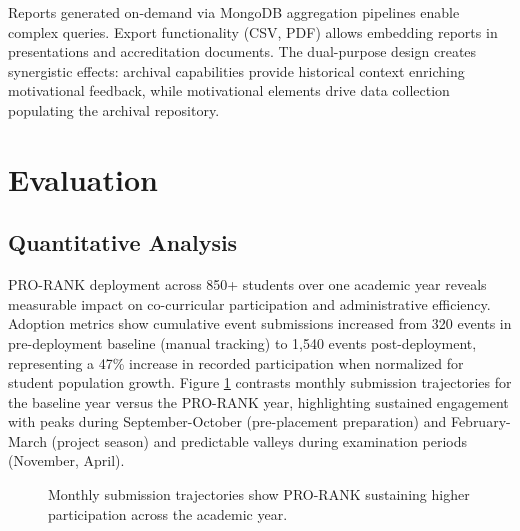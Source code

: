\documentclass[12pt]{article}
\begin{document}
Reports generated on-demand via MongoDB aggregation pipelines enable complex queries. Export functionality (CSV, PDF) allows embedding reports in presentations and accreditation documents. The dual-purpose design creates synergistic effects: archival capabilities provide historical context enriching motivational feedback, while motivational elements drive data collection populating the archival repository.


\section{Evaluation}

\subsection{Quantitative Analysis}
PRO-RANK deployment across 850+ students over one academic year reveals measurable impact on co-curricular participation and administrative efficiency. Adoption metrics show cumulative event submissions increased from 320 events in pre-deployment baseline (manual tracking) to 1,540 events post-deployment, representing a 47\% increase in recorded participation when normalized for student population growth. Figure \ref{fig:adoption} contrasts monthly submission trajectories for the baseline year versus the PRO-RANK year, highlighting sustained engagement with peaks during September-October (pre-placement preparation) and February-March (project season) and predictable valleys during examination periods (November, April).

\begin{figure}[t]
\centering
{}
\caption{Monthly submission trajectories show PRO-RANK sustaining higher participation across the academic year.}
\label{fig:adoption}
\end{figure}
\end{document}
